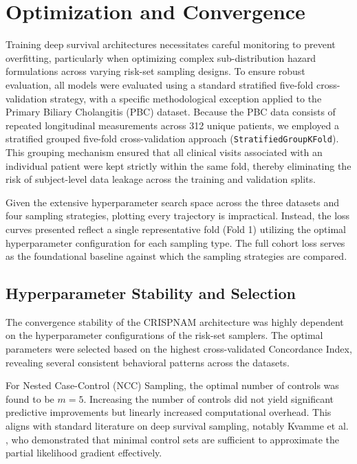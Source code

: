 \documentclass[a4paper,twoside,12pt]{report}
\begin{document}
\section{Optimization and Convergence}

Training deep survival architectures necessitates careful monitoring to prevent overfitting, particularly when optimizing complex sub-distribution hazard formulations across varying risk-set sampling designs. To ensure robust evaluation, all models were evaluated using a standard stratified five-fold cross-validation strategy, with a specific methodological exception applied to the Primary Biliary Cholangitis (PBC) dataset. Because the PBC data consists of repeated longitudinal measurements across 312 unique patients, we employed a stratified grouped five-fold cross-validation approach (\texttt{StratifiedGroupKFold}). This grouping mechanism ensured that all clinical visits associated with an individual patient were kept strictly within the same fold, thereby eliminating the risk of subject-level data leakage across the training and validation splits.

Given the extensive hyperparameter search space across the three datasets and four sampling strategies, plotting every trajectory is impractical. Instead, the loss curves presented reflect a single representative fold (Fold 1) utilizing the optimal hyperparameter configuration for each sampling type. The full cohort loss serves as the foundational baseline against which the sampling strategies are compared.

\subsection{Hyperparameter Stability and Selection}

The convergence stability of the CRISPNAM architecture was highly dependent on the hyperparameter configurations of the risk-set samplers. The optimal parameters were selected based on the highest cross-validated Concordance Index, revealing several consistent behavioral patterns across the datasets.

For Nested Case-Control (NCC) Sampling, the optimal number of controls was found to be $m = 5$. Increasing the number of controls did not yield significant predictive improvements but linearly increased computational overhead. This aligns with standard literature on deep survival sampling, notably Kvamme et al. \citep{kvamme2019}, who demonstrated that minimal control sets are sufficient to approximate the partial likelihood gradient effectively.
\end{document}
